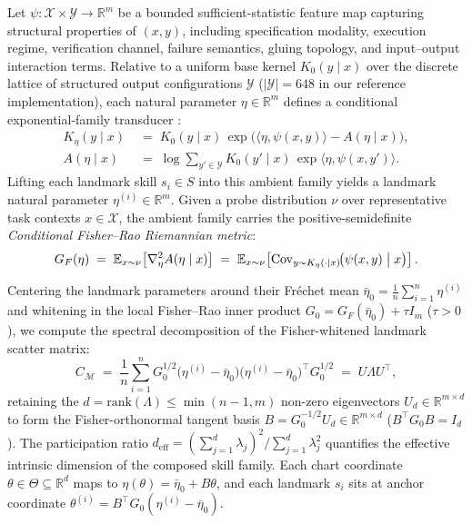 \documentclass[11pt]{article}
\theoremstyle{definition}
\theoremstyle{plain}
\newcommand{\Xcal}{\mathcal{X}}
\newcommand{\Ycal}{\mathcal{Y}}
\newcommand{\Mcal}{\mathcal{M}}
\newcommand{\Ebb}{\mathbb{E}}
\newcommand{\Rbb}{\mathbb{R}}
\newcommand{\Cov}{\mathrm{Cov}}
\begin{document}
Let $\psi : \Xcal \times \Ycal \to \Rbb^m$ be a bounded sufficient-statistic feature map capturing structural properties of $(x, y)$, including specification modality, execution regime, verification channel, failure semantics, gluing topology, and input--output interaction terms. Relative to a uniform base kernel $K_0(y \mid x)$ over the discrete lattice of structured output configurations $\Ycal$ ($|\Ycal| = 648$ in our reference implementation), each natural parameter $\eta \in \Rbb^m$ defines a conditional exponential-family transducer \citep{amari2016information}:
\begin{align}
  K_\eta(y \mid x) &\;=\; K_0(y \mid x)\,\exp\!\bigl(\langle \eta, \psi(x, y) \rangle - A(\eta \mid x)\bigr), \nonumber\\
  A(\eta \mid x) &\;=\; \log \sum_{y' \in \Ycal} K_0(y' \mid x)\,\exp\langle \eta, \psi(x, y') \rangle.
  \label{eq:exp-family}
\end{align}
Lifting each landmark skill $s_i \in S$ into this ambient family yields a landmark natural parameter $\eta^{(i)} \in \Rbb^m$. Given a probe distribution $\nu$ over representative task contexts $x \in \Xcal$, the ambient family carries the positive-semidefinite \emph{Conditional Fisher--Rao Riemannian metric}:
\begin{equation}
  G_F(\eta) \;=\; \Ebb_{x \sim \nu}\!\left[\nabla_\eta^2 A(\eta \mid x)\right]
  \;=\; \Ebb_{x \sim \nu}\!\left[\Cov_{y \sim K_\eta(\cdot \mid x)}\!\bigl(\psi(x, y) \bigm| x\bigr)\right].
  \label{eq:fisher-metric}
\end{equation}

Centering the landmark parameters around their Fr\'echet mean $\bar{\eta}_0 = \frac{1}{n}\sum_{i=1}^n \eta^{(i)}$ and whitening in the local Fisher--Rao inner product $G_0 = G_F(\bar{\eta}_0) + \tau I_m$ ($\tau > 0$), we compute the spectral decomposition of the Fisher-whitened landmark scatter matrix:
\begin{equation}
  C_{\Mcal} \;=\; \frac{1}{n} \sum_{i=1}^n G_0^{1/2}\bigl(\eta^{(i)} - \bar{\eta}_0\bigr)\bigl(\eta^{(i)} - \bar{\eta}_0\bigr)^\top G_0^{1/2}
  \;=\; U \Lambda U^\top,
  \label{eq:scatter}
\end{equation}
retaining the $d = \mathrm{rank}(\Lambda) \le \min(n-1, m)$ non-zero eigenvectors $U_d \in \Rbb^{m \times d}$ to form the Fisher-orthonormal tangent basis $B = G_0^{-1/2} U_d \in \Rbb^{m \times d}$ ($B^\top G_0 B = I_d$). The participation ratio $d_{\mathrm{eff}} = (\sum_{j=1}^d \lambda_j)^2 / \sum_{j=1}^d \lambda_j^2$ quantifies the effective intrinsic dimension of the composed skill family. Each chart coordinate $\theta \in \Theta \subseteq \Rbb^d$ maps to $\eta(\theta) = \bar{\eta}_0 + B\theta$, and each landmark $s_i$ sits at anchor coordinate $\theta^{(i)} = B^\top G_0(\eta^{(i)} - \bar{\eta}_0)$.
\end{document}
